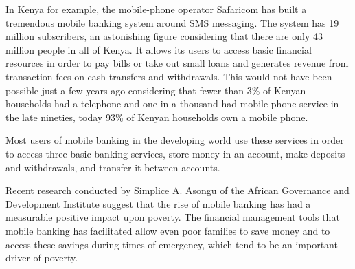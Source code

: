 \documentclass[12pt]{article}
\begin{document}
In Kenya for example, the mobile-phone operator Safaricom has built a tremendous mobile banking system around SMS messaging.\autocite{economist2013mobileBanking}
The system has 19 million subscribers, an astonishing figure considering that there are only 43 million people in all of Kenya.\autocite{economist2013mobileBanking}
It allows its users to access basic financial resources in order to pay bills or take out small loans and generates revenue from transaction fees on cash transfers and withdrawals.\autocite{economist2013mobileBanking}
This would not have been possible just a few years ago considering that fewer than 3\% of Kenyan households had a telephone and one in a thousand had mobile phone service in the late nineties, today 93\% of Kenyan households own a mobile phone.\autocite[5]{asongu2015impact}

Most users of mobile banking in the developing world use these services in order to access three basic banking services, store money in an account, make deposits and withdrawals, and transfer it between accounts.\autocite[6]{asongu2015impact}

Recent research conducted by Simplice A. Asongu of the African Governance and Development Institute suggest that the rise of mobile banking has had a measurable positive impact upon poverty.\autocite[14]{asongu2015impact}
The financial management tools that mobile banking has facilitated allow even poor families to save money and to access these savings during times of emergency, which tend to be an important driver of poverty.\autocite[14]{asongu2015impact}



\singlespacing
\nocite{*}
\printbibliography
\end{document}
